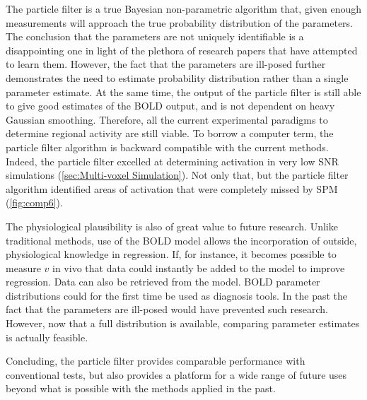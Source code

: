 The particle filter is a true Bayesian non-parametric algorithm that, given
enough measurements will approach the true probability distribution
of the parameters. The conclusion that the parameters are not
uniquely identifiable is a disappointing one in light of the plethora
of research papers that have attempted to learn them. However, the fact
that the parameters are ill-posed further demonstrates
the need to estimate probability distribution rather than a single 
parameter estimate. At the same time, the output of the particle filter
is still able to give good estimates of the BOLD output, and is not
dependent on heavy Gaussian smoothing. Therefore, all the current 
experimental paradigms to determine regional activity are still viable.
To borrow a computer term, the particle filter algorithm is backward 
compatible with the current methods. Indeed, the particle filter excelled
at determining activation in very low SNR simulations 
(\autoref{sec:Multi-voxel Simulation}). Not only that, but the particle
filter algorithm identified areas of activation that were completely
missed by SPM (\autoref{fig:comp6}). 

The physiological plausibility is also of great value to future
research. Unlike traditional methods, use of the BOLD model allows 
the incorporation of outside, physiological knowledge in regression.
If, for instance, it becomes possible to measure $v$ in vivo that data
could instantly be added to the model to improve regression. Data can
also be retrieved from the model. BOLD parameter distributions could 
for the first time be used as diagnosis tools. In the past the fact 
that the parameters are
ill-posed would have prevented such research. However, now that a full
distribution is available, comparing parameter estimates is actually
feasible. 

Concluding, the particle filter provides comparable performance with
conventional tests, but also provides a platform for a wide range of
future uses beyond what is possible with the methods applied in the
past.
